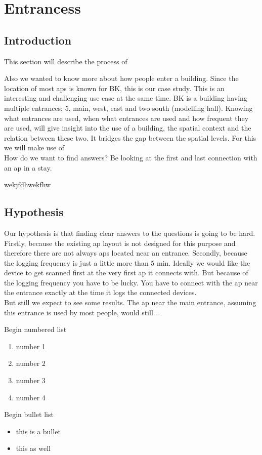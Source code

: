 \chapter{Entrancess}\label{entrances} 
\section{Introduction}\label{intro}
This section will describe the process of 

Also we wanted to know more about how people enter a building. Since the location of most aps is known for BK, this is our case study. This is an interesting and challenging use case at the same time. BK is a building having multiple entrances; 5, main, west, east and two south (modelling hall). Knowing what entrances are used, when what entrances are used and how frequent they are used, will give insight into the use of a building, the spatial context and the relation between these two. It bridges the gap between the spatial levels. For this we will make use of  
\\
How do we want to find answers? Be looking at the first and last connection with an ap in a stay. 

wekjfdhwekfhw \\

\section{Hypothesis}\label{hypo}
Our hypothesis is that finding clear answers to the questions is going to be hard. Firstly, because the existing ap layout is not designed for this purpose and therefore there are not always aps located near an entrance. Secondly, because the logging frequency is just a little more than 5 min. Ideally we would like the device to get scanned first at the very first ap it connects with. But because  of the logging frequency you have to be lucky. You have to connect with the ap near the entrance exactly at the time it logs the connected devices. 
\\
But still we expect to see some results. The ap near the main entrance, assuming this entrance is used by most people, would still...





Begin numbered list
\begin{enumerate}
\item number 1
\item number 2
\item number 3
\item number 4
\end{enumerate}
Begin bullet list
\begin{itemize}
\item this is a bullet
\item this as well
\end{itemize}


